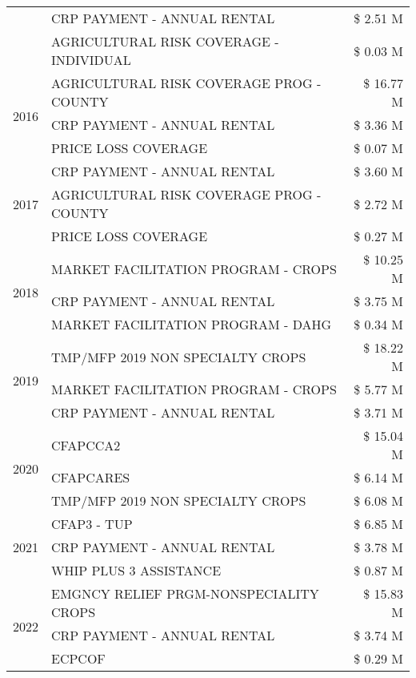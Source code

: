 \begin{tabular}{llr}
 & CRP PAYMENT - ANNUAL RENTAL & \$ 2.51 M \\
 & AGRICULTURAL RISK COVERAGE - INDIVIDUAL & \$ 0.03 M \\
\cline{1-3}
\multirow[t]{3}{*}{2016} & AGRICULTURAL RISK COVERAGE PROG - COUNTY & \$ 16.77 M \\
 & CRP PAYMENT - ANNUAL RENTAL & \$ 3.36 M \\
 & PRICE LOSS COVERAGE & \$ 0.07 M \\
\cline{1-3}
\multirow[t]{3}{*}{2017} & CRP PAYMENT - ANNUAL RENTAL & \$ 3.60 M \\
 & AGRICULTURAL RISK COVERAGE PROG - COUNTY & \$ 2.72 M \\
 & PRICE LOSS COVERAGE & \$ 0.27 M \\
\cline{1-3}
\multirow[t]{3}{*}{2018} & MARKET FACILITATION PROGRAM - CROPS & \$ 10.25 M \\
 & CRP PAYMENT - ANNUAL RENTAL & \$ 3.75 M \\
 & MARKET FACILITATION PROGRAM - DAHG & \$ 0.34 M \\
\cline{1-3}
\multirow[t]{3}{*}{2019} & TMP/MFP 2019 NON SPECIALTY CROPS & \$ 18.22 M \\
 & MARKET FACILITATION PROGRAM - CROPS & \$ 5.77 M \\
 & CRP PAYMENT - ANNUAL RENTAL & \$ 3.71 M \\
\cline{1-3}
\multirow[t]{3}{*}{2020} & CFAPCCA2 & \$ 15.04 M \\
 & CFAPCARES & \$ 6.14 M \\
 & TMP/MFP 2019 NON SPECIALTY CROPS & \$ 6.08 M \\
\cline{1-3}
\multirow[t]{3}{*}{2021} & CFAP3 - TUP & \$ 6.85 M \\
 & CRP PAYMENT - ANNUAL RENTAL & \$ 3.78 M \\
 & WHIP PLUS 3 ASSISTANCE & \$ 0.87 M \\
\cline{1-3}
\multirow[t]{3}{*}{2022} & EMGNCY RELIEF PRGM-NONSPECIALITY CROPS & \$ 15.83 M \\
 & CRP PAYMENT - ANNUAL RENTAL & \$ 3.74 M \\
 & ECPCOF & \$ 0.29 M \\
\cline{1-3}
\bottomrule
\end{tabular}
